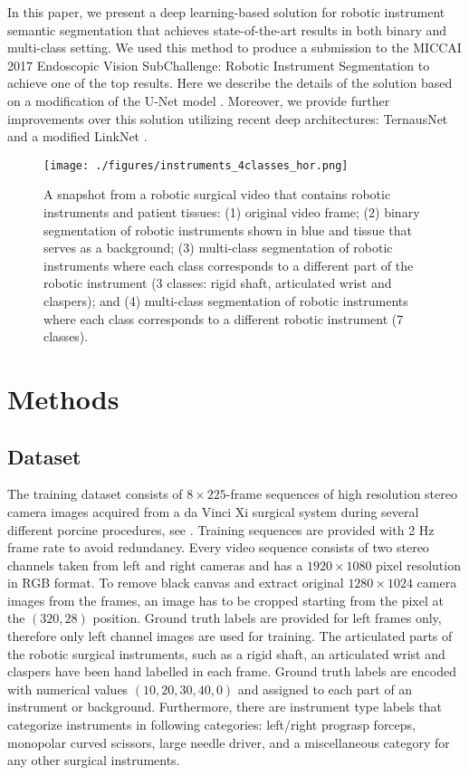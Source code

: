 \documentclass[runningheads,a4paper]{llncs}[2015/06/24]
\begin{document}
In this paper, we present a deep learning-based solution for robotic instrument semantic segmentation that achieves state-of-the-art results in both binary and multi-class setting. We used this method to produce a submission to the MICCAI 2017 Endoscopic Vision SubChallenge: Robotic Instrument Segmentation \cite{miccai2017} to achieve one of the top results. Here we describe the details of the solution based on a modification of the U-Net model \cite{ronneberger2015u, iglovikov2017satellite}. Moreover, we provide further improvements over this solution utilizing recent deep architectures: TernausNet \cite{iglovikov2018ternausnet} and a modified LinkNet \cite{chaurasia2017linknet}.

\begin{figure}[!t]
\centering
\texttt{[image: ./figures/instruments\_4classes\_hor.png]}
\caption{A snapshot from a robotic surgical video that contains robotic instruments and patient tissues: (1) original video frame; (2) binary segmentation of robotic instruments shown in blue and tissue that serves as a background; (3) multi-class segmentation of robotic instruments where each class corresponds to a different part of the robotic instrument (3 classes: rigid shaft, articulated wrist and claspers); and (4) multi-class segmentation of robotic instruments where each class corresponds to a different robotic instrument (7 classes).}
\label{fig::classes}
\end{figure}

\section{Methods}
\subsection{Dataset}
The training dataset consists of $8\times225$-frame sequences of high resolution stereo camera images acquired from a da Vinci Xi surgical system during several different porcine procedures, see \cite{miccai2017}. Training sequences are provided with 2 Hz frame rate to avoid redundancy. Every video sequence consists of two stereo channels taken from left and right cameras and has a $1920\times1080$ pixel resolution in RGB format. To remove black canvas and extract original $1280\times1024$ camera images from the frames, an image has to be cropped starting from the pixel at the $(320, 28)$ position. Ground truth labels are provided for left frames only, therefore only left channel images are used for training. The articulated parts of the robotic surgical instruments, such as a rigid shaft, an articulated wrist and claspers have been hand labelled in each frame. Ground truth labels are encoded with numerical values $(10, 20, 30, 40, 0)$ and assigned to each part of an instrument or background. Furthermore, there are instrument type labels that categorize instruments in following categories: left/right prograsp forceps, monopolar curved scissors, large needle driver, and a miscellaneous category for any other surgical instruments.
\end{document}
